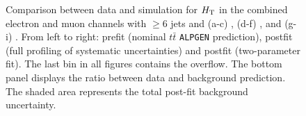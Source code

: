 \begin{figure}[h!tb]
\begin{center}
\caption{
Comparison between data and simulation for $\HT$ in the combined
electron and muon channels with $\geq 6$ jets and (a-c) \chii, (d-f) \chiii, and (g-i) \chiv.
From left to right: prefit (nominal $t\bar{t}$ \texttt{ALPGEN} prediction), 
postfit (full profiling of systematic uncertainties) and postfit (two-parameter fit).
The last bin in all figures contains the overflow. The bottom panel displays the ratio between data
and background prediction. The shaded area represents the total post-fit background uncertainty.}
\label{fig:HT_SignalRegion_FullProfiling}
\end{center}\end{figure}

